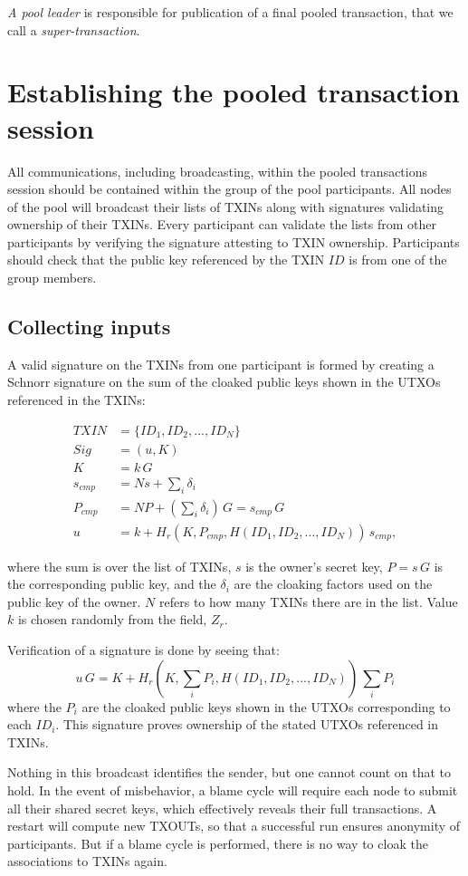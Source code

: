 \documentclass[8pt,fleqn,openany]{book}
\begin{document}
{\textit{A pool leader} is responsible for publication of a final pooled transaction, that we call a \textit{super-transaction}.

\section{Establishing the pooled transaction session}
All communications, including broadcasting, within the pooled transactions session should be contained within the group of the pool participants. All nodes of the pool will broadcast their lists of TXINs along with signatures validating ownership of their TXINs. Every participant can validate the lists from other participants by verifying the signature attesting to TXIN ownership. Participants should check that the public key referenced by the TXIN $ID$ is from one of the group members.

\subsection{Collecting inputs} 
A valid signature on the TXINs from one participant is formed by creating a Schnorr signature on the sum of the cloaked public keys shown in the UTXOs referenced in the TXINs:

\begin{align*}
TXIN &= \{ID_1, ID_2, ..., ID_N\}\\
Sig &= (u, K)\\
K &= k \, G \\
s_{cmp} &= N s + \sum_i{\delta_i}\\
P_{cmp} &= N P + (\sum_i{\delta_i})\, G = s_{cmp} \, G\\
u &= k + H_r(K, P_{cmp}, H(ID_1, ID_2, ..., ID_N)) \, s_{cmp},
\end{align*}

where the sum is over the list of TXINs, $s$ is the owner’s secret key, $P = s \, G$ is the corresponding public key, and the $\delta_i$ are the cloaking factors used on the public key of the owner. $N$ refers to how many TXINs there are in the list. Value $k$ is chosen randomly from the field, $Z_r$. 

Verification of a signature is done by seeing that:
$$u \, G = K + H_r(K, \sum_i{P_i}, H(ID_1, ID_2, ..., ID_N)) \, \sum_i{P_i}$$
where the $P_i$ are the cloaked public keys shown in the UTXOs corresponding to each $ID_i$. This signature proves ownership of the stated UTXOs referenced in TXINs.

Nothing in this broadcast identifies the sender, but one cannot count on that to hold. In the event of misbehavior, a blame cycle will require each node to submit all their shared secret keys, which effectively reveals their full transactions. A restart will compute new TXOUTs, so that a successful run ensures anonymity of participants. But if a blame cycle is performed, there is no way to cloak the associations to TXINs again.

}
\end{document}
